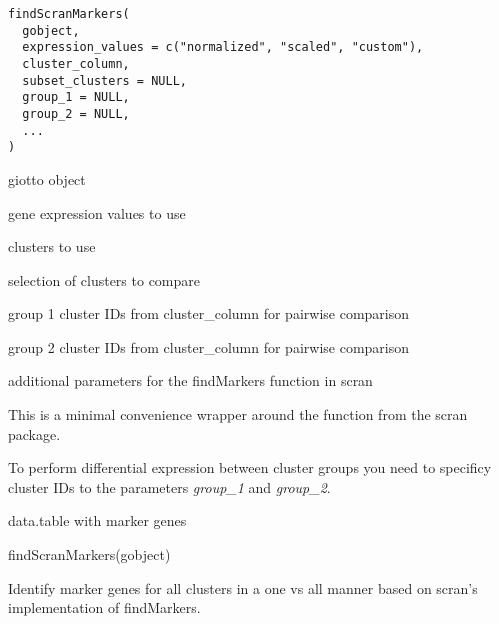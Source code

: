 \documentclass[a4paper]{book}
\begin{document}
%
\begin{Usage}
\begin{verbatim}
findScranMarkers(
  gobject,
  expression_values = c("normalized", "scaled", "custom"),
  cluster_column,
  subset_clusters = NULL,
  group_1 = NULL,
  group_2 = NULL,
  ...
)
\end{verbatim}
\end{Usage}
%
\begin{Arguments}
\begin{ldescription}
\item[\code{gobject}] giotto object

\item[\code{expression\_values}] gene expression values to use

\item[\code{cluster\_column}] clusters to use

\item[\code{subset\_clusters}] selection of clusters to compare

\item[\code{group\_1}] group 1 cluster IDs from cluster\_column for pairwise comparison

\item[\code{group\_2}] group 2 cluster IDs from cluster\_column for pairwise comparison

\item[\code{...}] additional parameters for the findMarkers function in scran
\end{ldescription}
\end{Arguments}
%
\begin{Details}\relax
This is a minimal convenience wrapper around
the  function from the scran package.

To perform differential expression between cluster groups you need to specificy cluster IDs
to the parameters \emph{group\_1} and \emph{group\_2}.
\end{Details}
%
\begin{Value}
data.table with marker genes
\end{Value}
%
\begin{Examples}
\begin{ExampleCode}
    findScranMarkers(gobject)
\end{ExampleCode}
\end{Examples}
%
\begin{Description}\relax
Identify marker genes for all clusters in a one vs all manner based on scran's implementation of findMarkers.
\end{Description}
\end{document}
